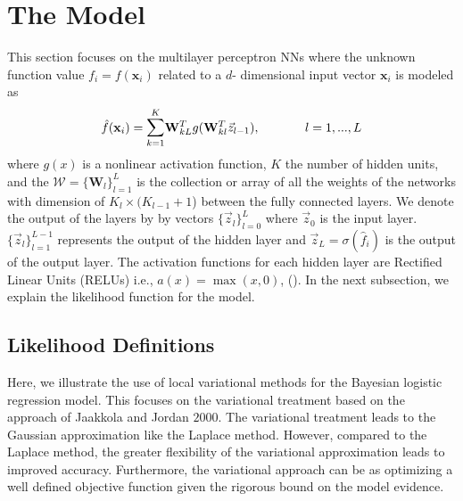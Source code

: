 \documentclass[]{article}
\begin{document}
\section{The Model}
This section focuses on the multilayer perceptron NNs where the unknown function value $f_i = f(\mathbf{x}_i)$ related to a $d$- dimensional input vector $\mathbf{x}_i$ is modeled as 
\begin{equation}
	\hat{f}(\mathbf{x}_i) = \mathlarger \sum_{k=1}^{K}\mathbf{W}_{kL}^Tg(\mathbf{W}_{kl}^T\vec{z}_{l-1}), \hspace*{0.5in} l = 1,...,L
	\label{equ:12}
\end{equation} 
where $g(x)$ is a nonlinear activation function, $K$ the number of hidden units, and the $\mathcal{W} = \{\mathbf{W}_l\}_{l=1}^L$ is the collection or array of all the weights of the networks with dimension of $K_l \times (K_{l-1} + 1$) between the fully connected layers. We denote the output of the layers by by vectors $\{\vec{z}_l\}_{l=0}^L$ where $\vec{z}_0$ is the input layer. $\{\vec{z}_l\}_{l=1}^{L-1}$ represents the output of the hidden layer and $\vec{z}_L = \sigma(\hat{f}_i)$ is the output of the output layer. The activation functions for each hidden layer are Rectified Linear Units (RELUs) i.e., $a(x) = \max(x,0)$, (\cite{nair2010}). In the next subsection, we explain the likelihood function for the model.
\subsection{Likelihood Definitions}
Here, we illustrate the use of local variational methods for the Bayesian logistic regression model. This focuses on the variational treatment based on the approach of Jaakkola and Jordan $2000$. The variational treatment leads to the Gaussian approximation like the Laplace method. However, compared to the Laplace method, the greater flexibility of the variational approximation leads to improved accuracy. Furthermore, the variational approach can be as optimizing a well defined objective function given the rigorous bound on the model evidence. 
\end{document}
